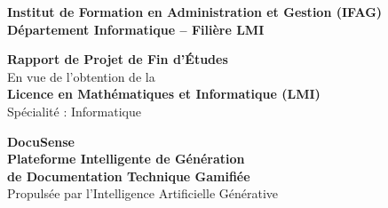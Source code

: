 \documentclass[12pt, a4paper, twoside, openany]{report}
\begin{document}

\begin{titlepage}
  \thispagestyle{empty}

  \vspace*{0.2cm}
  {\color{white}\bfseries\Large\centering
    Institut de Formation en Administration et Gestion (IFAG)\\[4pt]
    \normalsize D\'epartement Informatique -- Fili\`ere LMI\\
  }

  \vspace{1.2cm}
  \begin{center}
    {\large\color{DSdark}\bfseries Rapport de Projet de Fin d'\'Etudes}\\[6pt]
    {\normalsize En vue de l'obtention de la}\\[4pt]
    {\Large\color{DSblue}\bfseries Licence en Math\'ematiques et Informatique (LMI)}\\[2pt]
    {\normalsize Sp\'ecialit\'e : Informatique}
  \end{center}

  \vspace{0.8cm}
  \begin{center}
    \begin{tcolorbox}[
      colback=DSlight, colframe=DSblue,
      width=14cm, arc=10pt, boxrule=1.5pt]
      \centering
      {\color{DSdark}\bfseries\huge DocuSense}\\[8pt]
      {\color{DSpurple}\large\bfseries Plateforme Intelligente de G\'en\'eration}\\
      {\color{DSpurple}\large\bfseries de Documentation Technique Gamifi\'ee}\\[10pt]
      {\color{DSblue}\normalsize Propuls\'ee par l'Intelligence Artificielle G\'en\'erative}
    \end{tcolorbox}
  \end{center}


\end{titlepage}
\end{document}
